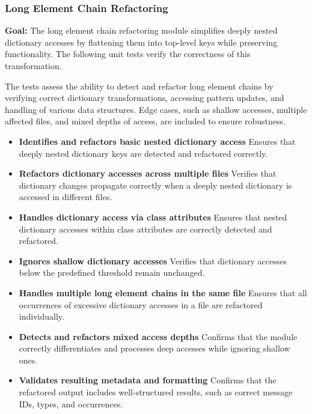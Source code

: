\documentclass[12pt, titlepage]{article}
\begin{document}
\subsubsection{Long Element Chain Refactoring}

\textbf{Goal:} The long element chain refactoring module simplifies deeply nested dictionary accesses by flattening them into top-level keys while preserving functionality. The following unit tests verify the correctness of this transformation.

The tests assess the ability to detect and refactor long element chains by verifying correct dictionary transformations, accessing pattern updates, and handling of various data structures. Edge cases, such as shallow accesses, multiple affected files, and mixed depths of access, are included to ensure robustness.

\begin{itemize}
\item \textbf{Identifies and refactors basic nested dictionary access} \newline
Ensures that deeply nested dictionary keys are detected and refactored correctly.

\item \textbf{Refactors dictionary accesses across multiple files} \newline
Verifies that dictionary changes propagate correctly when a deeply nested dictionary is accessed in different files.

\item \textbf{Handles dictionary access via class attributes} \newline
Ensures that nested dictionary accesses within class attributes are correctly detected and refactored.

\item \textbf{Ignores shallow dictionary accesses} \newline
Verifies that dictionary accesses below the predefined threshold remain unchanged.

\item \textbf{Handles multiple long element chains in the same file} \newline
Ensures that all occurrences of excessive dictionary accesses in a file are refactored individually.

\item \textbf{Detects and refactors mixed access depths} \newline
Confirms that the module correctly differentiates and processes deep accesses while ignoring shallow ones.

\item \textbf{Validates resulting metadata and formatting} \newline
Confirms that the refactored output includes well-structured results, such as correct message IDs, types, and occurrences.
\end{itemize}
\end{document}
